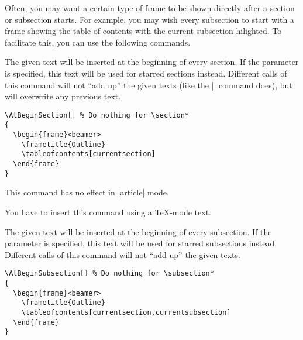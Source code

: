 Often, you may want a certain type of frame to be shown directly after
a section or subsection starts. For example, you may wish every
subsection to start with a frame showing the table of contents with
the current subsection hilighted. To facilitate this, you can use the
following  commands.


\begin{command}{\AtBeginSection{}}
  The given text will be inserted at the beginning of every
  section. If the  parameter is specified,
  this text will be used for starred sections instead. Different calls
  of this command will not ``add up'' the given texts (like the
  |\AtBeginDocument| command does), but will  overwrite any previous
  text.

  \example
\begin{verbatim}
\AtBeginSection[] % Do nothing for \section*
{
  \begin{frame}<beamer>
    \frametitle{Outline}
    \tableofcontents[currentsection]
  \end{frame}
}
\end{verbatim}

  \articlenote
  This command has no effect in |article| mode.

  \lyxnote
  You have to insert this command using a \TeX-mode text.
\end{command}


\begin{command}{\AtBeginSubsection{}}
  The given text will be inserted at the beginning of every
  subsection. If the  parameter is specified,
  this text will be used for starred subsections instead. Different calls
  of this command will not ``add up'' the given texts.

  \example
\begin{verbatim}
\AtBeginSubsection[] % Do nothing for \subsection*
{
  \begin{frame}<beamer>
    \frametitle{Outline}
    \tableofcontents[currentsection,currentsubsection]
  \end{frame}
}
\end{verbatim}
\end{command}


